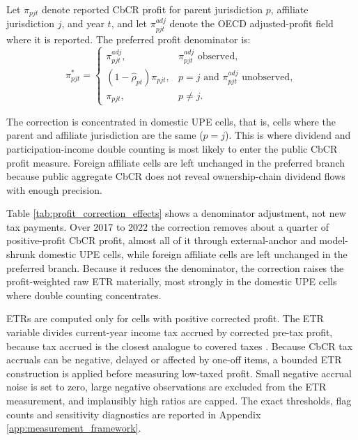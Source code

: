 \documentclass[11pt,a4paper]{article}
\begin{document}
Let $\pi_{pjt}$ denote reported CbCR profit for parent jurisdiction $p$, affiliate jurisdiction $j$, and year $t$, and let $\pi^{adj}_{pjt}$ denote the OECD adjusted-profit field where it is reported. The preferred profit denominator is:
\begin{equation}\label{eq:profit_reconciliation_branch}
\pi^{*}_{pjt} =
\begin{cases}
\pi^{adj}_{pjt}, & \pi^{adj}_{pjt}\text{ observed},\\
(1-\widehat{\rho}_{pt})\pi_{pjt}, & p=j \text{ and } \pi^{adj}_{pjt}\text{ unobserved},\\
\pi_{pjt}, & p\neq j.
\end{cases}
\end{equation}

The correction is concentrated in domestic UPE cells, that is, cells where the parent and affiliate jurisdiction are the same ($p=j$). This is where dividend and participation-income double counting is most likely to enter the public CbCR profit measure. Foreign affiliate cells are left unchanged in the preferred branch because public aggregate CbCR does not reveal ownership-chain dividend flows with enough precision.

Table \ref{tab:profit_correction_effects} shows a denominator adjustment, not new tax payments. Over 2017 to 2022 the correction removes about a quarter of positive-profit CbCR profit, almost all of it through external-anchor and model-shrunk domestic UPE cells, while foreign affiliate cells are left unchanged in the preferred branch. Because it reduces the denominator, the correction raises the profit-weighted raw ETR materially, most strongly in the domestic UPE cells where double counting concentrates. 



ETRs are computed only for cells with positive corrected profit. The ETR variable divides current-year income tax accrued by corrected pre-tax profit, because tax accrued is the closest analogue to covered taxes \citep{hanlon2023}. Because CbCR tax accruals can be negative, delayed or affected by one-off items, a bounded ETR construction is applied before measuring low-taxed profit. Small negative accrual noise is set to zero, large negative observations are excluded from the ETR measurement, and implausibly high ratios are capped. The exact thresholds, flag counts and sensitivity diagnostics are reported in Appendix \ref{app:measurement_framework}.
\end{document}
